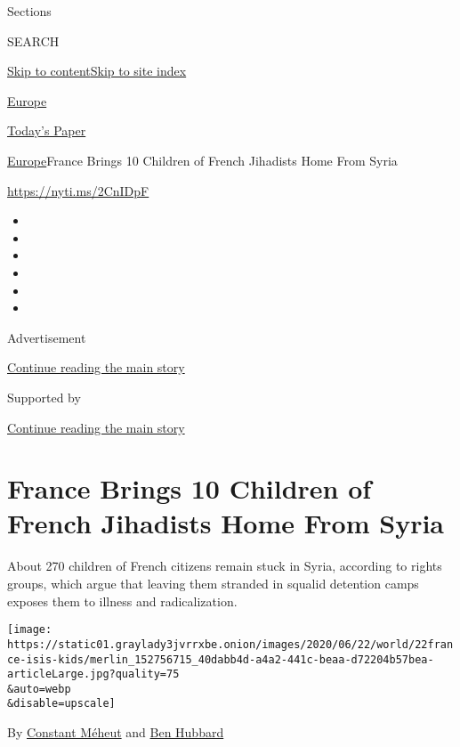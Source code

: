 Sections

SEARCH

\protect\hyperlink{site-content}{Skip to
content}\protect\hyperlink{site-index}{Skip to site index}

\href{https://www.nytimes3xbfgragh.onion/section/world/europe}{Europe}

\href{https://myaccount.nytimes3xbfgragh.onion/auth/login?response_type=cookie\&client_id=vi}{}

\href{https://www.nytimes3xbfgragh.onion/section/todayspaper}{Today's
Paper}

\href{/section/world/europe}{Europe}\textbar{}France Brings 10 Children
of French Jihadists Home From Syria

\url{https://nyti.ms/2CnIDpF}

\begin{itemize}
\item
\item
\item
\item
\item
\item
\end{itemize}

Advertisement

\protect\hyperlink{after-top}{Continue reading the main story}

Supported by

\protect\hyperlink{after-sponsor}{Continue reading the main story}

\hypertarget{france-brings-10-children-of-french-jihadists-home-from-syria}{%
\section{France Brings 10 Children of French Jihadists Home From
Syria}\label{france-brings-10-children-of-french-jihadists-home-from-syria}}

About 270 children of French citizens remain stuck in Syria, according
to rights groups, which argue that leaving them stranded in squalid
detention camps exposes them to illness and radicalization.

\texttt{[image: https://static01.graylady3jvrrxbe.onion/images/2020/06/22/world/22france-isis-kids/merlin\_152756715\_40dabb4d-a4a2-441c-beaa-d72204b57bea-articleLarge.jpg?quality=75\\\&auto=webp\\\&disable=upscale]}

By \href{https://www.nytimes3xbfgragh.onion/by/constant-meheut}{Constant
Méheut} and \href{https://www.nytimes3xbfgragh.onion/by/ben-hubbard}{Ben
Hubbard}

